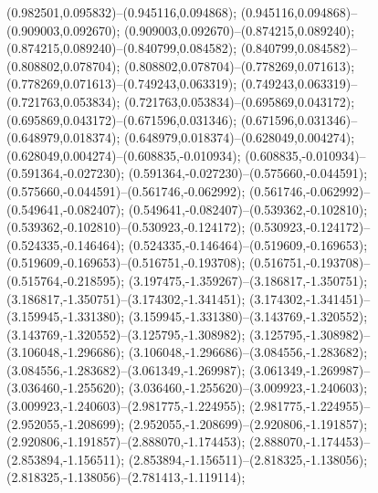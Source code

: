  (0.982501,0.095832)--(0.945116,0.094868);
 (0.945116,0.094868)--(0.909003,0.092670);
 (0.909003,0.092670)--(0.874215,0.089240);
 (0.874215,0.089240)--(0.840799,0.084582);
 (0.840799,0.084582)--(0.808802,0.078704);
 (0.808802,0.078704)--(0.778269,0.071613);
 (0.778269,0.071613)--(0.749243,0.063319);
 (0.749243,0.063319)--(0.721763,0.053834);
 (0.721763,0.053834)--(0.695869,0.043172);
 (0.695869,0.043172)--(0.671596,0.031346);
 (0.671596,0.031346)--(0.648979,0.018374);
 (0.648979,0.018374)--(0.628049,0.004274);
 (0.628049,0.004274)--(0.608835,-0.010934);
 (0.608835,-0.010934)--(0.591364,-0.027230);
 (0.591364,-0.027230)--(0.575660,-0.044591);
 (0.575660,-0.044591)--(0.561746,-0.062992);
 (0.561746,-0.062992)--(0.549641,-0.082407);
 (0.549641,-0.082407)--(0.539362,-0.102810);
 (0.539362,-0.102810)--(0.530923,-0.124172);
 (0.530923,-0.124172)--(0.524335,-0.146464);
 (0.524335,-0.146464)--(0.519609,-0.169653);
 (0.519609,-0.169653)--(0.516751,-0.193708);
 (0.516751,-0.193708)--(0.515764,-0.218595);
 (3.197475,-1.359267)--(3.186817,-1.350751);
 (3.186817,-1.350751)--(3.174302,-1.341451);
 (3.174302,-1.341451)--(3.159945,-1.331380);
 (3.159945,-1.331380)--(3.143769,-1.320552);
 (3.143769,-1.320552)--(3.125795,-1.308982);
 (3.125795,-1.308982)--(3.106048,-1.296686);
 (3.106048,-1.296686)--(3.084556,-1.283682);
 (3.084556,-1.283682)--(3.061349,-1.269987);
 (3.061349,-1.269987)--(3.036460,-1.255620);
 (3.036460,-1.255620)--(3.009923,-1.240603);
 (3.009923,-1.240603)--(2.981775,-1.224955);
 (2.981775,-1.224955)--(2.952055,-1.208699);
 (2.952055,-1.208699)--(2.920806,-1.191857);
 (2.920806,-1.191857)--(2.888070,-1.174453);
 (2.888070,-1.174453)--(2.853894,-1.156511);
 (2.853894,-1.156511)--(2.818325,-1.138056);
 (2.818325,-1.138056)--(2.781413,-1.119114);

